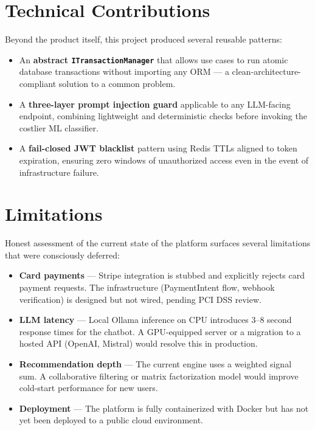 \section*{Technical Contributions}

Beyond the product itself, this project produced several reusable patterns:

\begin{itemize}
  \item An \textbf{abstract \texttt{ITransactionManager}} that allows use cases
        to run atomic database transactions without importing any ORM ---
        a clean-architecture-compliant solution to a common problem.
  \item A \textbf{three-layer prompt injection guard} applicable to any
        LLM-facing endpoint, combining lightweight and deterministic checks
        before invoking the costlier ML classifier.
  \item A \textbf{fail-closed JWT blacklist} pattern using Redis TTLs aligned
        to token expiration, ensuring zero windows of unauthorized access
        even in the event of infrastructure failure.
\end{itemize}

\section*{Limitations}

Honest assessment of the current state of the platform surfaces several
limitations that were consciously deferred:

\begin{itemize}
  \item \textbf{Card payments} --- Stripe integration is stubbed and explicitly
        rejects card payment requests. The infrastructure (PaymentIntent flow,
        webhook verification) is designed but not wired, pending PCI DSS review.
  \item \textbf{LLM latency} --- Local Ollama inference on CPU introduces
        3--8 second response times for the chatbot. A GPU-equipped server
        or a migration to a hosted API (OpenAI, Mistral) would resolve this
        in production.
  \item \textbf{Recommendation depth} --- The current engine uses a weighted
        signal sum. A collaborative filtering or matrix factorization model
        would improve cold-start performance for new users.
  \item \textbf{Deployment} --- The platform is fully containerized with Docker
        but has not yet been deployed to a public cloud environment.
\end{itemize}

